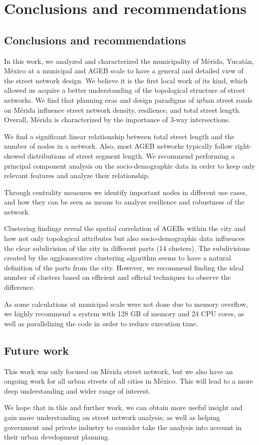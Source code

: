 \chapter{Conclusions and recommendations}
\label{cha:conclusions}
\section{Conclusions and recommendations}

In this work, we analyzed and characterized the municipality of Mérida, Yucatán, México at a municipal and AGEB scale to have a general and detailed view of the street network design. We believe it is the first local work of its kind, which allowed us acquire a better understanding of the topological structure of street networks. We find that planning eras and design paradigms of urban street roads on Mérida influence street network density, resilience, and total street length. Overall, Mérida is characterized by the importance of 3-way intersections.

We find a significant linear relationship between total street length and the number of nodes in a network. Also, most AGEB networks typically follow right-skewed distributions of street segment length. We recommend performing a principal component analysis on the socio-demographic data in order to keep only relevant features and analyze their relationship.

Through centrality measures we identify important nodes in different use cases, and how they can be seen as means to analyze resilience and robustness of the network.

Clustering findings reveal the spatial correlation of AGEBs within the city and how not only topological attributes but also socio-demographic data influences the clear subdivision of the city in different parts (14 clusters). The subdivisions created by the agglomerative clustering algorithm seems to have a natural definition of the parts from the city. However, we recommend finding the ideal number of clusters based on efficient and official techniques to observe the difference.

As some calculations at municipal scale were not done due to memory overflow, we highly recommend a system with 128 GB of memory and 24 CPU cores, as well as parallelizing the code in order to reduce execution time.

\section{Future work}

This work was only focused on Mérida street network, but we also have an ongoing work for all urban streets of all cities in México. This will lead to a more deep understanding and wider range of interest.

We hope that in this and further work, we can obtain more useful insight and gain more understanding on street network analysis; as well as helping government and private industry to consider take the analysis into account in their urban development planning.

